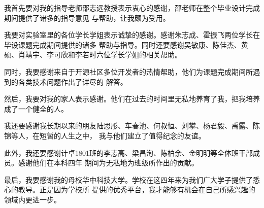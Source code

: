 \documentclass[supercite,notofont,hustthesis]{HustGraduPaper}
\begin{document}
\begin{thankpage}

我首先要对我的指导老师邵志远教授表示衷心的感谢，邵老师在整个毕业设计完成期间提供了诸多的指导意见
与帮助，让我颇为受用。

我要对实验室里的各位学长学姐表示诚挚的感谢。感谢朱志成、霍振飞两位学长在毕设课题完成期间提供的诸多
帮助与指导。同时还要感谢吴敏康、陈佳杰、黄硕、肖靖宇、李可欣和李若时六位学长学姐的相关帮助。

同时，我要感谢来自于开源社区多位开发者的热情帮助，他们为课题完成期间所遇到的各类技术问题作出了详尽的
解答。

然后，我要对我的家人表示感谢。他们在过去的时间里无私地养育了我，把我培养成了一个健全的人。

我还要感谢我长期以来的朋友陆思彤、车春池、何叔恒、刘攀、杨君毅、禹露、陈锦等人，在短暂的人生之中，
我与他们建立了值得纪念的友谊。

此外，我还要感谢计卓1801班的李志高、梁昌洵、陈柏余、金明明等全体班干部成员。感谢他们在本科四年
期间为无私地为班级所作出的贡献。

最后，我要感谢我的母校华中科技大学。学校在这四年来为我们广大学子提供了悉心的教导。正是因为学校所
提供的优秀平台，我才能够有机会在自己所感兴趣的领域内更进一步。

\end{thankpage}


\end{document}
